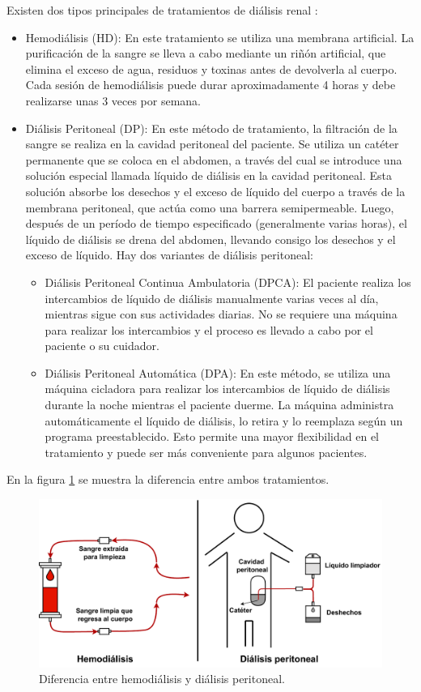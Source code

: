 Existen dos tipos principales de tratamientos de diálisis renal \citep{ARTICULO1}:

\begin{itemize}
\item Hemodiálisis (HD): En este tratamiento se utiliza una membrana artificial. La purificación de la sangre se lleva a cabo mediante un riñón artificial, que elimina el exceso de agua, residuos y toxinas antes de devolverla al cuerpo. Cada sesión de hemodiálisis puede durar aproximadamente 4 horas y debe realizarse unas 3 veces por semana.
\item Diálisis Peritoneal (DP): En este método de tratamiento, la filtración de la sangre se realiza en la cavidad peritoneal del paciente. Se utiliza un catéter permanente que se coloca en el abdomen, a través del cual se introduce una solución especial llamada líquido de diálisis en la cavidad peritoneal. Esta solución absorbe los desechos y el exceso de líquido del cuerpo a través de la membrana peritoneal, que actúa como una barrera semipermeable. Luego, después de un período de tiempo especificado (generalmente varias horas), el líquido de diálisis se drena del abdomen, llevando consigo los desechos y el exceso de líquido. Hay dos variantes de diálisis peritoneal: 
    \begin{itemize}
    \item Diálisis Peritoneal Continua Ambulatoria (DPCA): El paciente realiza los intercambios de líquido de diálisis manualmente varias veces al día, mientras sigue con sus actividades diarias. No se requiere una máquina para realizar los intercambios y el proceso es llevado a cabo por el paciente o su cuidador.
    \item Diálisis Peritoneal Automática (DPA): En este método, se utiliza una máquina cicladora para realizar los intercambios de líquido de diálisis durante la noche mientras el paciente duerme. La máquina administra automáticamente el líquido de diálisis, lo retira y lo reemplaza según un programa preestablecido. Esto permite una mayor flexibilidad en el tratamiento y puede ser más conveniente para algunos pacientes.
    \end{itemize}
\end{itemize}

En la figura \ref{fig:diagDialisis} se muestra la diferencia entre ambos tratamientos.

\begin{figure}[htpb]
\centering 
\includegraphics[width=.98\textwidth]{./Figures/Dialisis.pdf}
\caption{Diferencia entre hemodiálisis y diálisis peritoneal.}
\label{fig:diagDialisis}
\end{figure}


